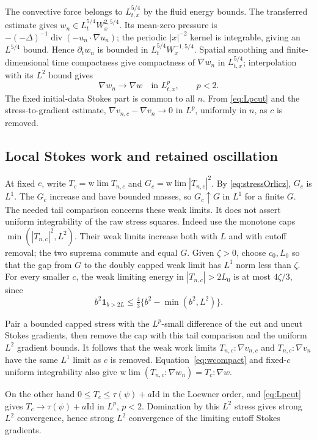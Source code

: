 \documentclass[11pt]{article}
\numberwithin{equation}{section}
\newcommand{\Div}{\operatorname{div}}
\newcommand{\grad}{\nabla}
\newcommand{\Id}{\mathrm{Id}}
\begin{document}
The convective force belongs to $L^{5/4}_{t,x}$ by the fluid energy bounds.
The transferred estimate gives $w_n\in L^{5/4}_tW^{2,5/4}_x$.
Its mean-zero pressure is $-(-\Delta)^{-1}\Div(-u_n\cdot\grad u_n)$;
the periodic $|x|^{-2}$ kernel is integrable, giving an $L^{5/4}$ bound.
Hence $\partial_tw_n$ is bounded in $L^{5/4}_tW^{-1,5/4}_x$.
Spatial smoothing and finite-dimensional time compactness give compactness
of $\grad w_n$ in $L^{5/4}_{t,x}$; interpolation with its $L^2$ bound gives
\begin{equation}\label{eq:wcompact}
 \grad w_n\longrightarrow\grad w\quad\text{in }L^p_{t,x},\qquad p<2.
\end{equation}
The fixed initial-data Stokes part is common to all $n$. From
\eqref{eq:Lpcut} and the stress-to-gradient estimate,
$\grad v_{n,c}-\grad v_n\to0$ in $L^p$, uniformly in $n$, as $c$ is removed.

\subsection{Local Stokes work and retained oscillation}\label{subsec:localwork}
At fixed $c$, write $T_c=\mathrm{w}\!\lim T_{n,c}$ and
$G_c=\mathrm{w}\!\lim|T_{n,c}|^2$. By \eqref{eq:stressOrlicz}, $G_c$ is
$L^1$. The $G_c$ increase and have bounded masses, so $G_c\uparrow G$ in
$L^1$ for a finite $G$. The needed tail comparison concerns these weak
limits. It does not assert uniform integrability of the raw stress squares.
Indeed use the monotone caps $\min(|T_{n,c}|^2,L^2)$. Their weak limits
increase both with $L$ and with cutoff removal; the two suprema commute and
equal $G$. Given $\zeta>0$, choose $c_0,L_0$ so that the gap from $G$ to the
doubly capped weak limit has $L^1$ norm less than $\zeta$. For every smaller
$c$, the weak limiting energy in $|T_{n,c}|>2L_0$ is at most
$4\zeta/3$, since
\[
 b^2\mathbf1_{b>2L}\leq\tfrac43\{b^2-\min(b^2,L^2)\}.
\]

Pair a bounded capped stress with the $L^p$-small difference of the cut and
uncut Stokes gradients, then remove the cap with this tail comparison and
the uniform $L^2$ gradient bounds. It follows that the weak work limits
$T_{n,c}:\grad v_{n,c}$ and $T_{n,c}:\grad v_n$ have the same $L^1$ limit
as $c$ is removed. Equation~\eqref{eq:wcompact} and fixed-$c$ uniform
integrability also give
$\mathrm{w}\!\lim(T_{n,c}:\grad w_n)=T_c:\grad w$.

On the other hand $0\leq T_c\leq\tau(\psi)+a\Id$ in the Loewner order,
and \eqref{eq:Lpcut} gives $T_c\to\tau(\psi)+a\Id$ in $L^p$, $p<2$.
Domination by this $L^2$ stress gives strong $L^2$ convergence, hence strong
$L^2$ convergence of the limiting cutoff Stokes gradients.
\end{document}
